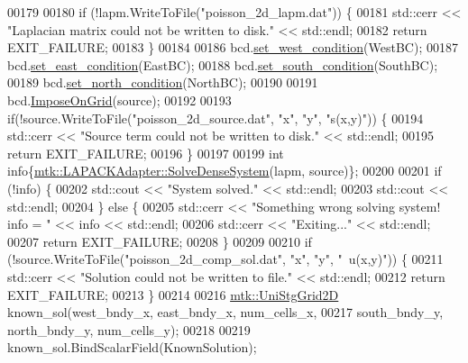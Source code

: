 \begin{DoxyCode}
00179 
00180   \textcolor{keywordflow}{if} (!lapm.WriteToFile(\textcolor{stringliteral}{"poisson\_2d\_lapm.dat"})) \{
00181     std::cerr << \textcolor{stringliteral}{"Laplacian matrix could not be written to disk."} << std::endl;
00182     \textcolor{keywordflow}{return} EXIT\_FAILURE;
00183   \}
00184 
00186   bcd.\hyperlink{classmtk_1_1RobinBCDescriptor2D_aeaff87510dc1773effc0b5429579de23}{set\_west\_condition}(WestBC);
00187   bcd.\hyperlink{classmtk_1_1RobinBCDescriptor2D_a94570f6e741bb00038c4bf81842d226c}{set\_east\_condition}(EastBC);
00188   bcd.\hyperlink{classmtk_1_1RobinBCDescriptor2D_a3fbdf58ba24861011fd852f0c642a4c8}{set\_south\_condition}(SouthBC);
00189   bcd.\hyperlink{classmtk_1_1RobinBCDescriptor2D_ade17884e6a2636a7c6f989602a0052e0}{set\_north\_condition}(NorthBC);
00190 
00191   bcd.\hyperlink{classmtk_1_1RobinBCDescriptor2D_ac9564bc46c196cbf4720a0e4b93da8b0}{ImposeOnGrid}(source);
00192 
00193   \textcolor{keywordflow}{if}(!source.WriteToFile(\textcolor{stringliteral}{"poisson\_2d\_source.dat"}, \textcolor{stringliteral}{"x"}, \textcolor{stringliteral}{"y"}, \textcolor{stringliteral}{"s(x,y)"})) \{
00194     std::cerr << \textcolor{stringliteral}{"Source term could not be written to disk."} << std::endl;
00195     \textcolor{keywordflow}{return} EXIT\_FAILURE;
00196   \}
00197 
00199   \textcolor{keywordtype}{int} info\{\hyperlink{classmtk_1_1LAPACKAdapter_a7428bccf74fd4a4af68fb7233846da22}{mtk::LAPACKAdapter::SolveDenseSystem}(lapm, source)\};
00200 
00201   \textcolor{keywordflow}{if} (!info) \{
00202     std::cout << \textcolor{stringliteral}{"System solved."} << std::endl;
00203     std::cout << std::endl;
00204   \} \textcolor{keywordflow}{else} \{
00205     std::cerr << \textcolor{stringliteral}{"Something wrong solving system! info = "} << info << std::endl;
00206     std::cerr << \textcolor{stringliteral}{"Exiting..."} << std::endl;
00207     \textcolor{keywordflow}{return} EXIT\_FAILURE;
00208   \}
00209 
00210   \textcolor{keywordflow}{if} (!source.WriteToFile(\textcolor{stringliteral}{"poisson\_2d\_comp\_sol.dat"}, \textcolor{stringliteral}{"x"}, \textcolor{stringliteral}{"y"}, \textcolor{stringliteral}{"~u(x,y)"})) \{
00211     std::cerr << \textcolor{stringliteral}{"Solution could not be written to file."} << std::endl;
00212     \textcolor{keywordflow}{return} EXIT\_FAILURE;
00213   \}
00214 
00216   \hyperlink{classmtk_1_1UniStgGrid2D}{mtk::UniStgGrid2D} known\_sol(west\_bndy\_x, east\_bndy\_x, num\_cells\_x,
00217                               south\_bndy\_y, north\_bndy\_y, num\_cells\_y);
00218 
00219   known\_sol.BindScalarField(KnownSolution);

\end{DoxyCode}
